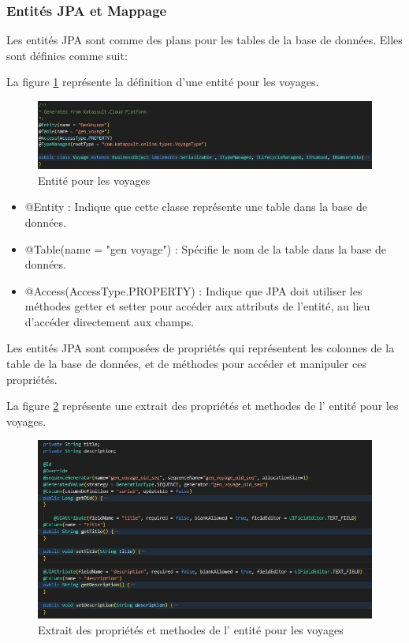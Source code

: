 \documentclass[12pt]{report}
\begin{document}
			\subsubsection{Entités JPA et Mappage}

			\hspace{15pt} Les entités JPA sont comme des plans pour les tables de la base de données. Elles sont définies comme suit:

			La figure \ref{fig:entityjpa} représente la définition d'une entité pour les voyages.
			
			\begin{figure}[h]
				\centering
				\includegraphics[width=\textwidth]{entityjpa.jpg}
				\caption{Entité pour les voyages}
				\label{fig:entityjpa}
			\end{figure}
			\FloatBarrier

			\begin{itemize}
				\item @Entity : Indique que cette classe représente une table dans la base de données.
				\item @Table(name = "gen voyage") : Spécifie le nom de la table dans la base de données.
				\item @Access(AccessType.PROPERTY) : Indique que JPA doit utiliser les méthodes getter et setter pour accéder aux attributs de l'entité, au lieu d'accéder directement aux champs.
			\end{itemize}
	
			Les entités JPA sont composées de propriétés qui représentent les colonnes de la table de la base de données, et de méthodes pour accéder et manipuler ces propriétés.

			La figure \ref{fig:propmeth} représente une extrait des propriétés et methodes de l' entité pour les voyages.
			
			\begin{figure}[h]
				\centering
				\includegraphics[width=\textwidth]{propmeth.jpg}
				\caption{Extrait des propriétés et methodes de l' entité pour les voyages}
				\label{fig:propmeth}
			\end{figure}
			\FloatBarrier
\end{document}
